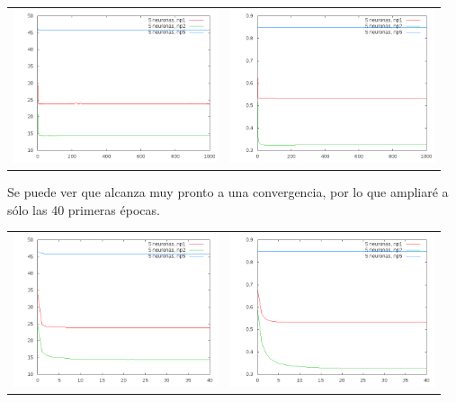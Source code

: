 \documentclass[12pt]{article}
\begin{document}
\begin{center}
   \begin{tabular}{ c  c }
     \includegraphics[width=6cm]{graficosparte2a/error_train_caotic_5n} &
     \includegraphics[width=6cm]{graficosparte2a/ecm_train_caotic_5n}\\ 
   \end{tabular}
 \end{center}

Se puede ver que alcanza muy pronto a una convergencia, por lo que ampliaré a sólo las 40 primeras épocas.

\begin{center}
   \begin{tabular}{ c  c }
     \includegraphics[width=6cm]{graficosparte2a/error_train_caotic_5n_200} &
     \includegraphics[width=6cm]{graficosparte2a/ecm_train_caotic_5n_200}\\ 
   \end{tabular}
 \end{center}
 
\end{document}

